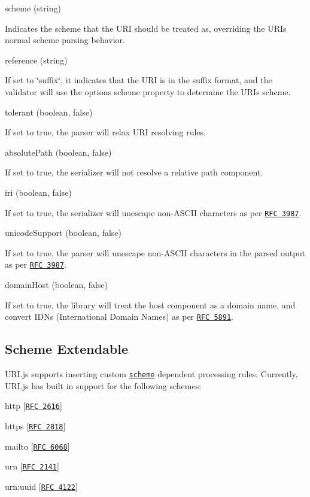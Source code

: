 \begin{DoxyItemize}
\item {\ttfamily scheme} (string)

Indicates the scheme that the U\+RI should be treated as, overriding the U\+RI\textquotesingle{}s normal scheme parsing behavior.
\item {\ttfamily reference} (string)

If set to {\ttfamily \char`\"{}suffix\char`\"{}}, it indicates that the U\+RI is in the suffix format, and the validator will use the option\textquotesingle{}s {\ttfamily scheme} property to determine the U\+RI\textquotesingle{}s scheme.
\item {\ttfamily tolerant} (boolean, false)

If set to {\ttfamily true}, the parser will relax U\+RI resolving rules.
\item {\ttfamily absolute\+Path} (boolean, false)

If set to {\ttfamily true}, the serializer will not resolve a relative {\ttfamily path} component.
\item {\ttfamily iri} (boolean, false)

If set to {\ttfamily true}, the serializer will unescape non-\/\+A\+S\+C\+II characters as per \href{http://www.ietf.org/rfc/rfc3987.txt}{\tt R\+FC 3987}.
\item {\ttfamily unicode\+Support} (boolean, false)

If set to {\ttfamily true}, the parser will unescape non-\/\+A\+S\+C\+II characters in the parsed output as per \href{http://www.ietf.org/rfc/rfc3987.txt}{\tt R\+FC 3987}.
\item {\ttfamily domain\+Host} (boolean, false)

If set to {\ttfamily true}, the library will treat the {\ttfamily host} component as a domain name, and convert I\+D\+Ns (International Domain Names) as per \href{http://www.ietf.org/rfc/rfc5891.txt}{\tt R\+FC 5891}.
\end{DoxyItemize}

\subsection*{Scheme Extendable}

U\+R\+I.\+js supports inserting custom \href{http://en.wikipedia.org/wiki/URI_scheme}{\tt scheme} dependent processing rules. Currently, U\+R\+I.\+js has built in support for the following schemes\+:


\begin{DoxyItemize}
\item http \mbox{[}\href{http://www.ietf.org/rfc/rfc2616.txt}{\tt R\+FC 2616}\mbox{]}
\item https \mbox{[}\href{http://www.ietf.org/rfc/rfc2818.txt}{\tt R\+FC 2818}\mbox{]}
\item mailto \mbox{[}\href{http://www.ietf.org/rfc/rfc6068.txt}{\tt R\+FC 6068}\mbox{]}
\item urn \mbox{[}\href{http://www.ietf.org/rfc/rfc2141.txt}{\tt R\+FC 2141}\mbox{]}
\item urn\+:uuid \mbox{[}\href{http://www.ietf.org/rfc/rfc4122.txt}{\tt R\+FC 4122}\mbox{]}
\end{DoxyItemize}

